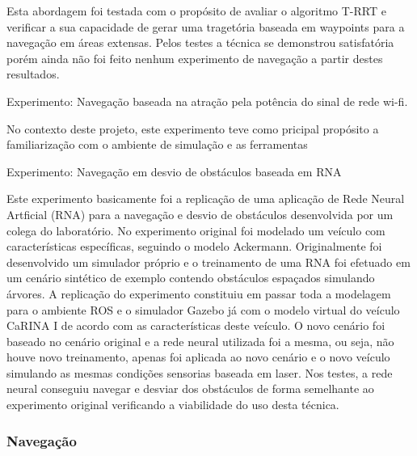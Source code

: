 \documentclass{article}
\begin{document}
Esta abordagem foi testada com o propósito de avaliar o algoritmo T-RRT e
verificar a sua capacidade de gerar uma tragetória baseada em waypoints para a
navegação em áreas extensas. Pelos testes a técnica se demonstrou
satisfatória porém ainda não foi feito nenhum experimento de navegação a partir
destes resultados. 


Experimento: Navegação baseada na atração pela potência do sinal de rede wi-fi.

No contexto deste projeto, este experimento teve como pricipal propósito a
familiarização com o ambiente de simulação e as ferramentas 



Experimento: Navegação em desvio de obstáculos baseada em RNA

Este experimento basicamente foi a replicação de uma aplicação de Rede Neural
Artficial (RNA) para a navegação e desvio de obstáculos desenvolvida por um
colega do laboratório. No experimento original foi modelado um veículo com
características específicas, seguindo o modelo Ackermann. Originalmente foi 
desenvolvido um simulador próprio e o treinamento de uma RNA foi efetuado em um
cenário sintético de exemplo contendo obstáculos espaçados simulando árvores. A
replicação do experimento constituiu em passar toda a modelagem para o ambiente
ROS e o simulador Gazebo já com o modelo virtual do veículo CaRINA I de acordo
com as características deste veículo. O novo cenário foi baseado no cenário
original e a rede neural utilizada foi a mesma, ou seja, não houve novo
treinamento, apenas foi aplicada ao novo cenário e o novo veículo simulando as
mesmas condições sensorias baseada em laser. Nos testes, a rede neural conseguiu
navegar e desviar dos obstáculos de forma semelhante ao experimento original
verificando a viabilidade do uso desta técnica.




\subsubsection{Navegação}
\end{document}
